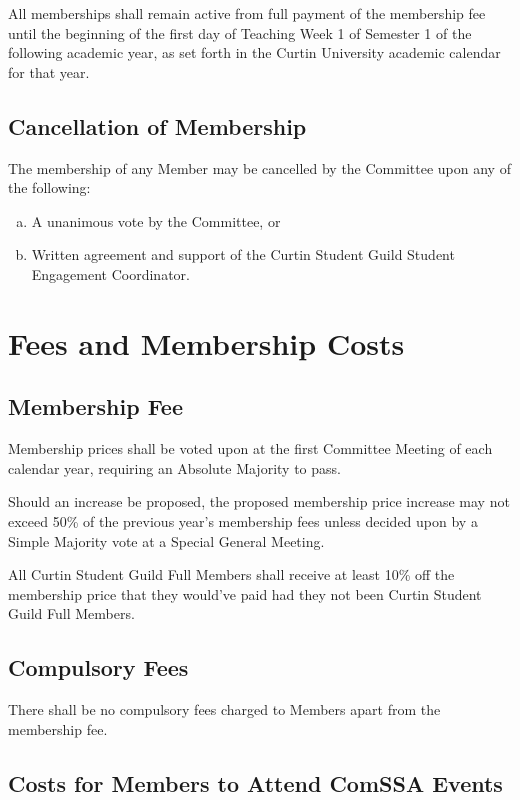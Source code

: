 \documentclass[a4paper,12pt]{article}
\begin{document}
All memberships shall remain active from full payment of the membership fee until the beginning of the first day of Teaching Week 1 of Semester 1 of the following academic year, as set forth in the Curtin University academic calendar for that year.

\subsection{Cancellation of Membership}

The membership of any Member may be cancelled by the Committee upon any of the following:

\begin{enumerate}[a)]
	\item A unanimous vote by the Committee, or
	\item Written agreement and support of the Curtin Student Guild Student Engagement Coordinator.
\end{enumerate}

\section{Fees and Membership Costs}

\subsection{Membership Fee}

Membership prices shall be voted upon at the first Committee Meeting of each calendar year, requiring an Absolute Majority to pass.

Should an increase be proposed, the proposed membership price increase may not exceed 50\% of the previous year's membership fees unless decided upon by a Simple Majority vote at a Special General Meeting.

All Curtin Student Guild Full Members shall receive at least 10\% off the membership price that they would've paid had they not been Curtin Student Guild Full Members.

\subsection{Compulsory Fees}

There shall be no compulsory fees charged to Members apart from the membership fee.

\subsection{Costs for Members to Attend ComSSA Events}
\end{document}
